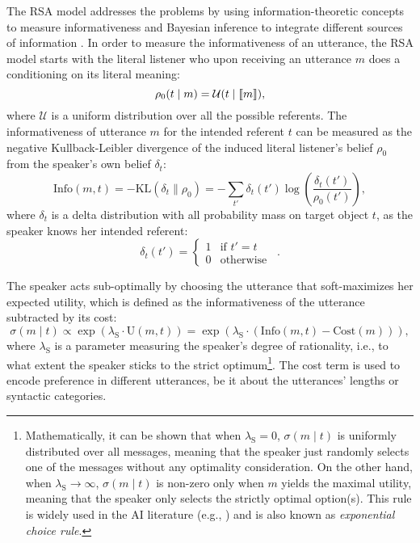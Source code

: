 The RSA model addresses the problems by using information-theoretic
concepts to measure informativeness and Bayesian inference to
integrate different sources of information
\cite{Frank2009,Frank,Bergen2012,GoodmanStuhlmuller2013:Knowledge-and-I}. In
order to measure the informativeness of an utterance, the RSA model
starts with the literal listener who upon receiving an utterance $m$
does a conditioning on its literal meaning:
\begin{equation}\label{Bayesian_literal}
\rho_0(t \mid m) = \mathcal{U}(t\mid \llbracket m \rrbracket) ,
\end{equation}
where $\mathcal{U}$ is a uniform distribution over all the possible
referents. The informativeness of utterance $m$ for the intended
referent $t$ can be measured as the negative Kullback-Leibler
divergence of the induced literal listener's belief $\rho_0$ from the
speaker's own belief $\delta_t$:
\begin{equation} \label{Bayesian_sender_informativeness}
\mbox{Info}(m,t)=-\mbox{KL}(\delta_t \| \rho_0)=-\sum_{t'}\delta_t(t')\log\left(\frac{\delta_t(t')}{\rho_0(t')}\right),
\end{equation}
where $\delta_t$ is a delta distribution with all probability mass on
target object $t$, as the speaker knows her intended referent:
\begin{equation} \label{Bayesian_sender_delta}
\delta_t(t')=\left\{ \begin{array}{ll}
1 & \mbox{if } t' = t \\
0 & \mbox{otherwise}
\end{array}\right. \enspace .
\end{equation}

The speaker acts sub-optimally by choosing the utterance that soft-maximizes her expected utility, which is defined as the informativeness of the utterance subtracted by its cost:
\begin{equation} \label{Bayesian_sender_softmax}
\sigma(m \mid t) \propto \exp(\lambda_\mathrm{S}\cdot \mbox{U}(m,t))=\exp(\lambda_\mathrm{S} \cdot (\mbox{Info}(m,t)-\mbox{Cost}(m))),
\end{equation}
where $\lambda_\mathrm{S}$ is a parameter measuring the speaker's
degree of rationality, i.e., to what extent the speaker sticks to the
strict optimum\footnote{Mathematically, it can be shown that when $\lambda_\mathrm{S}=0$, $\sigma(m \mid t)$ is uniformly distributed over all messages, meaning that the speaker just randomly selects one of the messages without any optimality consideration. 
On the other hand, when $\lambda_\mathrm{S}\rightarrow \infty$, 
$\sigma(m \mid t)$ is non-zero only when $m$ yields the maximal utility, 
meaning that the speaker only selects the strictly optimal option(s).
This rule is widely used in the AI literature (e.g., \cite{Sutton1998RL}) and 
is also known as \emph{exponential choice rule}.}.
The cost term is used to encode preference in
different utterances, be it about the utterances' lengths or syntactic
categories.


